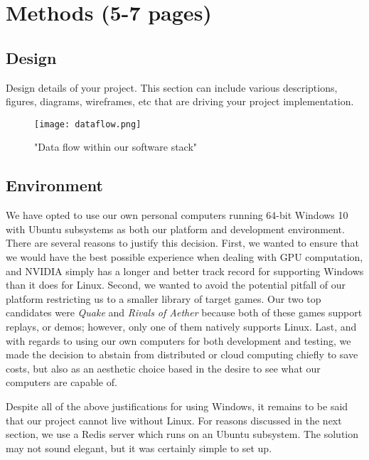 \chapter{Methods (5-7 pages)}


\section{Design}

Design details of your project. This section can include various descriptions, figures, diagrams, wireframes, etc that are driving your project implementation.

\begin{figure}
	\caption{"Data flow within our software stack"}
	\centering
		\texttt{[image: dataflow.png]} \\
\end{figure}




\section{Environment}

We have opted to use our own personal computers running 64-bit Windows 10 with Ubuntu subsystems as both our platform and development environment. There are several reasons to justify this decision. First, we wanted to ensure that we would have the best possible experience when dealing with GPU computation, and NVIDIA simply has a longer and better track record for supporting Windows than it does for Linux. Second, we wanted to avoid the potential pitfall of our platform restricting us to a smaller library of target games. Our two top candidates were {\it Quake} and {\it Rivals of Aether} because both of these games support replays, or demos; however, only one of them natively supports Linux. Last, and with regards to using our own computers for both development and testing, we made the decision to abstain from distributed or cloud computing chiefly to save costs, but also as an aesthetic choice based in the desire to see what our computers are capable of.

Despite all of the above justifications for using Windows, it remains to be said that our project cannot live without Linux. For reasons discussed in the next section, we use a Redis server which runs on an Ubuntu subsystem. The solution may not sound elegant, but it was certainly simple to set up.


